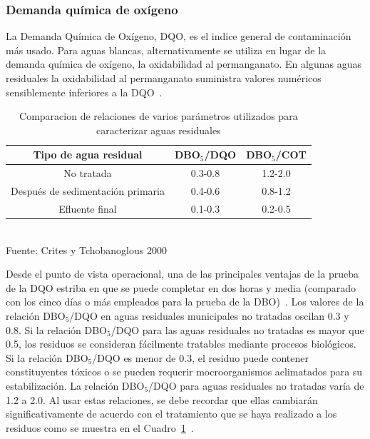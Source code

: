 \subsubsection*{Demanda química de oxígeno}
La Demanda Química de Oxígeno, DQO, es el indice general de contaminación más usado. Para aguas blancas, alternativamente se utiliza en lugar de la demanda química de oxígeno, la oxidabilidad al permanganato. En algunas aguas residuales la oxidabilidad al permanganato suministra valores numéricos sensiblemente inferiores a la DQO~\citep{manuel13}.\\
\begin{table}[!h]
\begin{center}
\caption{Comparacion de relaciones de varios parámetros utilizados para caracterizar aguas residuales}
\label{tab:comparacion}
	\begin{tabular}{ | c  c  c |}
	\hline
	\textbf{Tipo de agua residual} & DBO$_{5}$/DQO & DBO$_{5}$/COT \\
	\hline
	No tratada & 0.3-0.8 & 1.2-2.0 \\
	Después de sedimentación primaria & 0.4-0.6 & 0.8-1.2 \\
	Efluente final & 0.1-0.3 & 0.2-0.5 \\
	\hline
	\end{tabular}
	\\{\small{Fuente: Crites y Tchobanoglous 2000}}
\end{center}
\end{table}

Desde el punto de vista operacional, una de las principales ventajas de la prueba de la DQO estriba en que se puede completar en dos horas y media (comparado con los cinco días o más empleados para la prueba de la DBO)~\citep{ron}.
Los valores de la relación DBO$_{5}$/DQO en aguas residuales municipales no tratadas oscilan 0.3 y 0.8. Si la relación DBO$_{5}$/DQO para las aguas residuales no tratadas es mayor que 0.5, los residuos se consideran fácilmente tratables mediante procesos biológicos. Si la relación DBO$_{5}$/DQO es menor de 0.3, el residuo puede contener constituyentes tóxicos o se pueden requerir mocroorganismos aclimatados para su estabilización. La relación DBO$_{5}$/DQO para aguas residuales no tratadas varía de 1.2 a 2.0. Al usar estas relaciones, se debe recordar que ellas cambiarán significativamente de acuerdo con el tratamiento que se haya realizado a los residuos como se muestra en el Cuadro~\ref{tab:comparacion}~\citep{ron}.

